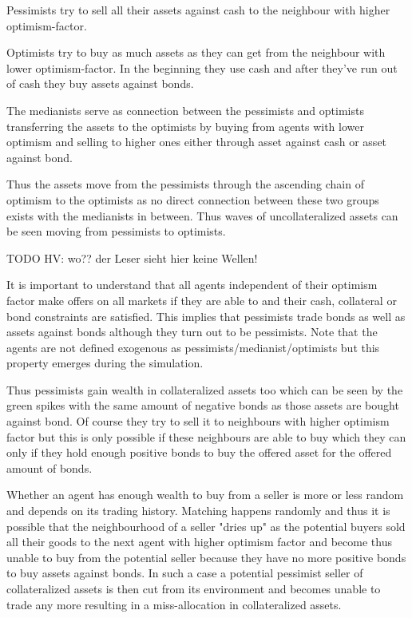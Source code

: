 \documentclass[Bachelorarbeit.tex]{subfiles}
\begin{document}
\medskip 

Pessimists try to sell all their assets against cash to the neighbour with higher optimism-factor.

\medskip 

Optimists try to buy as much assets as they can get from the neighbour with lower optimism-factor. In the beginning they use cash and after they've run out of cash they buy assets against bonds.

\medskip 

The medianists serve as connection between the pessimists and optimists transferring the assets to the optimists by buying from agents with lower optimism and selling to higher ones either through asset against cash or asset against bond.

\medskip 

Thus the assets move from the pessimists through the ascending chain of optimism to the optimists as no direct connection between these two groups exists with the medianists in between. Thus waves of uncollateralized assets can be seen moving from pessimists to optimists.

TODO HV: wo?? der Leser sieht hier keine Wellen!

\medskip 

It is important to understand that all agents independent of their optimism factor make offers on all markets if they are able to and their cash, collateral or bond constraints are satisfied. This implies that pessimists trade bonds as well as assets against bonds although they turn out to be pessimists. Note that the agents are not defined exogenous as pessimists/medianist/optimists but this property emerges during the simulation.

\medskip 

Thus pessimists gain wealth in collateralized assets too which can be seen by the green spikes with the same amount of negative bonds as those assets are bought against bond. Of course they try to sell it to neighbours with higher optimism factor but this is only possible if these neighbours are able to buy which they can only if they hold enough positive bonds to buy the offered asset for the offered amount of bonds.



\medskip 

Whether an agent has enough wealth to buy from a seller is more or less random and depends on its trading history. Matching happens randomly and thus it is possible that the neighbourhood of a seller "dries up" as the potential buyers sold all their goods to the next agent with higher optimism factor and become thus unable to buy from the potential seller because they have no more positive bonds to buy assets against bonds. In such a case a potential pessimist seller of collateralized assets is then cut from its environment and becomes unable to trade any more resulting in a miss-allocation in collateralized assets.
\end{document}
